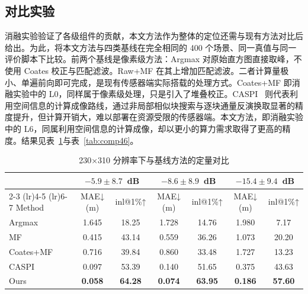 \subsection{对比实验}
\label{sec:comparison}

消融实验验证了各级组件的贡献，本文方法作为整体的定位还需与现有方法对比后给出。为此，将本文方法与四类基线在完全相同的 400 个场景、同一真值与同一评价脚本下比较。前两个基线是像素级方法：Argmax 对原始直方图直接取峰，不使用 Coates 校正与匹配滤波。Raw+MF 在其上增加匹配滤波。二者计算量极小、单遍前向即可完成，是现有传感器端实际搭载的处理方式。Coates+MF 即消融实验中的 L0，同样属于像素级处理，只是引入了堆叠校正。CASPI~\cite{Lee2023} 则代表利用空间信息的计算成像路线，通过非局部相似块搜索与逐块通量反演换取显著的精度提升，但计算开销大，难以部署在资源受限的传感器端。本文方法，即消融实验中的 L6，同属利用空间信息的计算成像，却以更小的算力需求取得了更高的精度。结果见表~\ref{tab:comp230}与表~\ref{tab:comp46}。

\begin{table}[t]
\centering
\caption{230×310 分辨率下与基线方法的定量对比}
\label{tab:comp230}\small\setlength{\tabcolsep}{10pt}
\begin{tabular}{l cc cc cc}
\toprule
 & \multicolumn{2}{c}{$-5.9 \pm 8.7$~dB} & \multicolumn{2}{c}{$-8.6 \pm 8.9$~dB} & \multicolumn{2}{c}{$-15.4 \pm 9.4$~dB} \\
\cmidrule(lr){2-3} \cmidrule(lr){4-5} \cmidrule(lr){6-7}
Method & MAE↓ (m) & inl@1\%↑ & MAE↓ (m) & inl@1\%↑ & MAE↓ (m) & inl@1\%↑ \\
\midrule
Argmax    & 1.645 & 18.25 & 1.728 & 14.76 & 1.980 & 7.17 \\
MF        & 0.415 & 43.14 & 0.559 & 36.26 & 1.073 & 20.20 \\
Coates+MF & 0.716 & 39.84 & 0.860 & 33.48 & 1.727 & 13.23 \\
CASPI     & 0.097 & 53.39 & 0.140 & 51.65 & 0.375 & 43.63 \\
Ours      & \textbf{0.058} & \textbf{64.28} & \textbf{0.074} & \textbf{63.95} & \textbf{0.186} & \textbf{57.60} \\
\bottomrule
\end{tabular}
\end{table}


